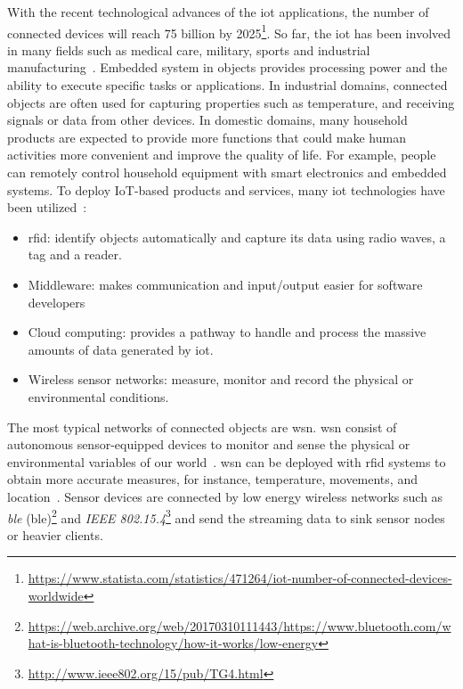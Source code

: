 With the recent technological advances of the \acrfull{iot} applications, the
number of connected devices will reach 75 billion by
2025\footnote{\url{https://www.statista.com/statistics/471264/iot-number-of-connected-devices-worldwide}}.
So far, the \acrshort{iot} has been involved in many fields such as medical
care, military, sports and industrial
manufacturing~\cite{boudargham2017exhaustive, lai2013survey, da2014internet}.
Embedded system in objects provides processing power and the ability to execute
specific tasks or applications. In industrial domains, connected objects are
often used for capturing properties such as temperature, and receiving signals
or data from other devices. In domestic domains, many household products are
expected to provide more functions that could make human activities more
convenient and improve the quality of life. For example, people can remotely
control household equipment with smart electronics and embedded systems. To
deploy IoT-based products and services, many \acrshort{iot} technologies have
been utilized~\cite{lee2015internet}:
\begin{itemize}
    \item \acrfull{rfid}: identify objects automatically
    and capture its data using radio waves, a tag and a reader.
    \item Middleware: makes communication and input/output easier for software
    developers
    \item Cloud computing: provides a pathway to handle and process the massive
    amounts of data generated by \acrshort{iot}.
    \item Wireless sensor networks: measure, monitor and record the physical
    or environmental conditions.
\end{itemize}

The most typical networks of connected objects are \acrfull{wsn}. \acrshort{wsn}
consist of autonomous sensor-equipped devices to monitor and sense the physical
or environmental variables of our world~\cite{lee2015internet, li2016temporal}.
\acrshort{wsn} can be deployed with \acrshort{rfid} systems to obtain more
accurate measures, for instance, temperature, movements, and
location~\cite{lee2015internet, atzori2010b}. Sensor devices are connected by
low energy wireless networks such as \emph{\acrlong{ble}}
(\acrshort{ble})\footnote{\url{https://web.archive.org/web/20170310111443/https://www.bluetooth.com/what-is-bluetooth-technology/how-it-works/low-energy}}
and \emph{IEEE 802.15.4}\footnote{\url{http://www.ieee802.org/15/pub/TG4.html}}
and send the streaming data to sink sensor nodes or heavier clients.

